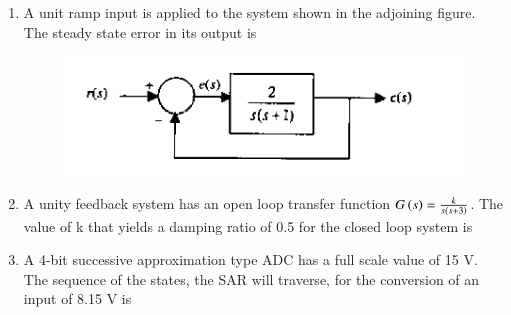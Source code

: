 \documentclass[journal,12pt,onecolumn]{IEEEtran}
\theoremstyle{remark}
\begin{document}
\begin{enumerate}
\begin{enumerate}
\begin{figure}[H]
\begin{multicols}{2}
        \caption*{}
        \label{38ad}
\end{multicols}
\end{figure}
\end{enumerate}

\item A unit ramp input is applied to the system shown in the adjoining figure. The steady state error in its output is
\begin{figure}[H]
    \centering
    \includegraphics[width = 0.7\columnwidth]{q39}
    \caption*{}
    \label{Q39}
\end{figure}
\hfill{}\begin{enumerate}  \end{enumerate}



\item A unity feedback system has an open loop transfer function $G\left(s\right) = \frac{k}{s\left(s+3\right)}$. The value of k that yields a damping ratio of 0.5 for the closed loop system is
\hfill{}\begin{enumerate}  \end{enumerate}

\item A 4-bit successive approximation type ADC has a full scale value of 15 V. The sequence of the states, the SAR will traverse, for the conversion of an input of 8.15 V is


\end{enumerate}
\end{document}

